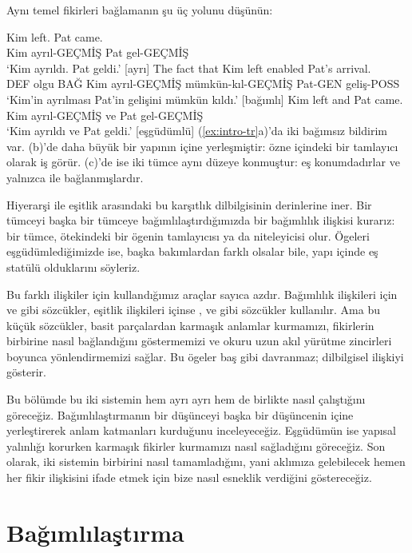 Aynı temel fikirleri bağlamanın şu üç yolunu düşünün:

\ea \label{ex:intro-tr}
    \ea \gll Kim left. Pat came.\\
        Kim ayrıl-GEÇMİŞ Pat gel-GEÇMİŞ\\
    \glt `Kim ayrıldı. Pat geldi.' [ayrı]
    \ex \gll The fact {\ob}that Kim left{\cb} enabled Pat's arrival.\\
        DEF olgu BAĞ Kim ayrıl-GEÇMİŞ mümkün-kıl-GEÇMİŞ Pat-GEN geliş-POSS\\
    \glt `Kim'in ayrılması Pat'in gelişini mümkün kıldı.' [bağımlı]
    \ex \gll Kim left and Pat came.\\
        Kim ayrıl-GEÇMİŞ ve Pat gel-GEÇMİŞ\\
    \glt `Kim ayrıldı ve Pat geldi.' [eşgüdümlü]
    \z
\z
(\ref{ex:intro-tr}a)'da iki bağımsız bildirim var. (b)'de  daha büyük bir yapının içine yerleşmiştir: özne içindeki bir tamlayıcı olarak iş görür. (c)'de ise iki tümce aynı düzeye konmuştur: eş konumdadırlar ve yalnızca  ile bağlanmışlardır.

Hiyerarşi ile eşitlik arasındaki bu karşıtlık dilbilgisinin derinlerine iner. Bir tümceyi başka bir tümceye bağımlılaştırdığımızda bir bağımlılık ilişkisi kurarız: bir tümce, ötekindeki bir ögenin tamlayıcısı ya da niteleyicisi olur. Ögeleri eşgüdümlediğimizde ise, başka bakımlardan farklı olsalar bile, yapı içinde eş statülü olduklarını söyleriz.

Bu farklı ilişkiler için kullandığımız araçlar sayıca azdır. Bağımlılık ilişkileri için  ve  gibi sözcükler, eşitlik ilişkileri içinse ,  ve  gibi sözcükler kullanılır. Ama bu küçük sözcükler, basit parçalardan karmaşık anlamlar kurmamızı, fikirlerin birbirine nasıl bağlandığını göstermemizi ve okuru uzun akıl yürütme zincirleri boyunca yönlendirmemizi sağlar. Bu ögeler baş gibi davranmaz; dilbilgisel ilişkiyi gösterir.

Bu bölümde bu iki sistemin hem ayrı ayrı hem de birlikte nasıl çalıştığını göreceğiz. Bağımlılaştırmanın bir düşünceyi başka bir düşüncenin içine yerleştirerek anlam katmanları kurduğunu inceleyeceğiz. Eşgüdümün ise yapısal yalınlığı korurken karmaşık fikirler kurmamızı nasıl sağladığını göreceğiz. Son olarak, iki sistemin birbirini nasıl tamamladığını, yani aklımıza gelebilecek hemen her fikir ilişkisini ifade etmek için bize nasıl esneklik verdiğini göstereceğiz.

\section{Bağımlılaştırma}\label{sec:subordination-tr}

